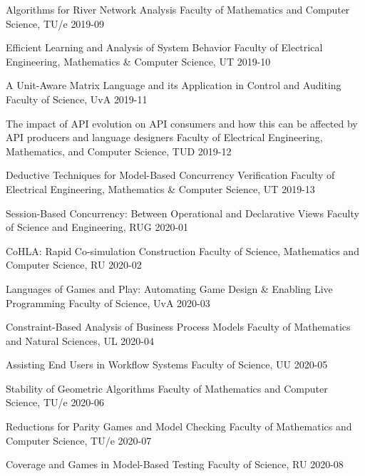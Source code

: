 \begin{multicols}{2}
         {Algorithms for River Network Analysis}
         {Faculty of Mathematics and Computer Science, TU/e}
         {2019-09}

         {Efficient Learning and Analysis of System Behavior}
         {Faculty of Electrical Engineering, Mathematics \& Computer Science, UT}
         {2019-10}

         {A Unit-Aware Matrix Language and its Application in Control and Auditing}
         {Faculty of Science, UvA}
         {2019-11}
		 
         {The impact of API evolution on API consumers and how this can be affected by API producers and language
designers}
         {Faculty of Electrical Engineering, Mathematics, and Computer Science, TUD}
         {2019-12}

         {Deductive Techniques for Model-Based Concurrency Verification}
         {Faculty of Electrical Engineering, Mathematics \& Computer Science, UT}
         {2019-13}

         {Session-Based Concurrency: Between Operational and Declarative Views}
         {Faculty of Science and Engineering, RUG}
         {2020-01}

         {CoHLA: Rapid Co-simulation Construction}
         {Faculty of Science, Mathematics and Computer Science, RU}
         {2020-02}

         {Languages of Games and Play: Automating Game Design \& Enabling Live Programming}
         {Faculty of Science, UvA}
         {2020-03}

         {Constraint-Based Analysis of Business Process Models}
         {Faculty of Mathematics and Natural Sciences, UL}
         {2020-04}
		 
         {Assisting End Users in Workflow Systems}
         {Faculty of Science, UU}
         {2020-05}
		 
         {Stability of Geometric Algorithms}
         {Faculty of Mathematics and Computer Science, TU/e}
         {2020-06}

         {Reductions for Parity Games and Model Checking}
         {Faculty of Mathematics and Computer Science, TU/e}
         {2020-07}

         {Coverage and Games in Model-Based Testing}
         {Faculty of Science, RU}
         {2020-08}


\end{multicols}
